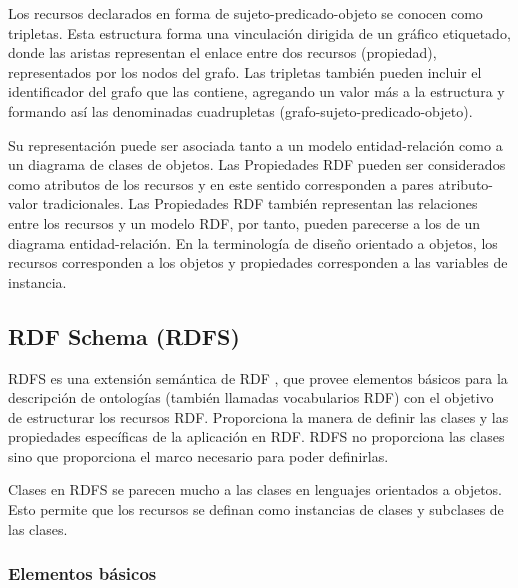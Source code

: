 Los recursos declarados en forma de sujeto-predicado-objeto se conocen como tripletas.
Esta estructura forma una vinculación dirigida de un gráfico etiquetado, donde las aristas representan el enlace entre dos 
recursos (propiedad), representados por los nodos del grafo.
Las tripletas también pueden incluir el identificador del grafo que las contiene, agregando un valor más a la estructura y formando así 
las denominadas cuadrupletas (grafo-sujeto-predicado-objeto).

Su representación puede ser asociada tanto a un modelo entidad-relación como a un diagrama de clases de objetos.
Las Propiedades RDF pueden ser considerados como atributos de los recursos y en este sentido corresponden a pares 
atributo-valor tradicionales. Las Propiedades RDF también representan las relaciones entre los recursos y un modelo RDF,
por tanto, pueden parecerse a los de un diagrama entidad-relación.
En la terminología de diseño orientado a objetos, los recursos corresponden a los objetos y propiedades 
corresponden a las variables de instancia.

\subsection{RDF Schema (RDFS)}

RDFS es una extensión semántica de RDF \cite{Guha2014}, que provee elementos básicos para la descripción de ontologías (también llamadas vocabularios RDF) con el objetivo
de estructurar los recursos RDF. Proporciona la manera de definir las clases y las propiedades específicas de la aplicación en RDF.
RDFS no proporciona las clases sino que proporciona el marco necesario para poder definirlas.

Clases en RDFS se parecen mucho a las clases en lenguajes orientados a objetos. Esto permite que los recursos se definan como 
instancias de clases y subclases de las clases.

\subsubsection{Elementos básicos}

